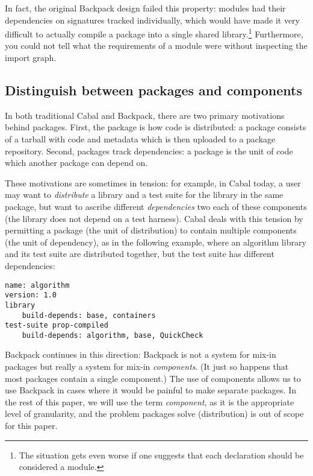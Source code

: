 In fact, the original Backpack design failed this property: modules had
their dependencies on signatures tracked individually, which would have
made it very difficult to actually compile a package into a single
shared library.\footnote{The situation gets even worse if one suggests
that each declaration should be considered a module.}  Furthermore, you
could not tell what the requirements of a module were without inspecting
the import graph.

\subsection{Distinguish between packages and components}

In both traditional Cabal and Backpack, there are two primary
motivations behind packages.  First, the package is how code is
distributed: a package consists of a tarball with code and metadata
which is then uploaded to a package repository.  Second, packages track
dependencies: a package is the unit of code which another package can
depend on.

These motivations are sometimes in tension: for example, in Cabal today,
a user may want to \emph{distribute} a library and a test suite for the
library in the same package, but want to ascribe different
\emph{dependencies} two each of these components (the library does not
depend on a test harness).  Cabal deals with this tension by permitting
a package (the unit of distribution) to contain multiple components (the
unit of dependency), as in the following example, where an algorithm
library and its test suite are distributed together, but the test suite
has different dependencies:

\begin{verbatim}
name: algorithm
version: 1.0
library
    build-depends: base, containers
test-suite prop-compiled
    build-depends: algorithm, base, QuickCheck
\end{verbatim}

Backpack continues in this direction: Backpack is not a system for
mix-in packages but really a system for mix-in \emph{components}.  (It
just so happens that most packages contain a single component.) The use
of components allows us to use Backpack in cases where it would be
painful to make separate packages.  In the rest of this paper, we will
use the term \emph{component},  as it is the appropriate level of
granularity, and the problem packages solve (distribution) is out of
scope for this paper.

